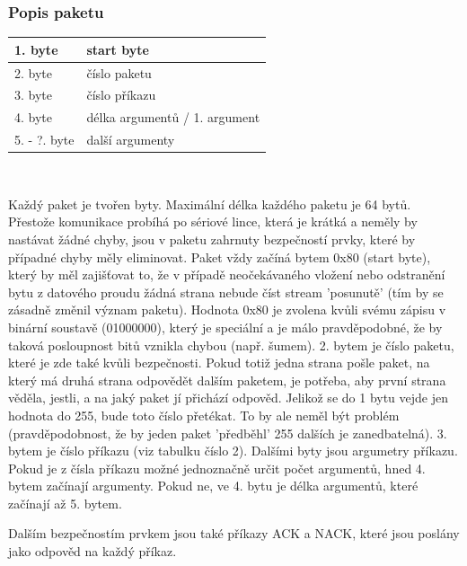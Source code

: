 \documentclass[12pt, a4paper, oneside]{article}
\begin{document}
\subsubsection{Popis paketu}

\vspace{3mm}
\begin{center}
\begin{tabular}{| l | l |}
\hline
1. byte & start byte \\ \hline
2. byte & číslo paketu \\ \hline
3. byte & číslo příkazu \\ \hline
4. byte & délka argumentů / 1. argument \\ \hline
5. - ?. byte & další argumenty \\ \hline
\end {tabular}
\\
\vspace{1mm}
\caption{Tabulka 1: Popis paketu}
\end{center}


Každý paket je tvořen byty. Maximální délka každého paketu je 64 bytů.
Přestože komunikace probíhá po sériové lince, která je krátká a neměly by nastávat žádné chyby, jsou v paketu zahrnuty bezpečností prvky, které by případné chyby měly eliminovat.
Paket vždy začíná bytem 0x80 (start byte), který by měl zajišťovat to, že v případě neočekávaného vložení nebo odstranění bytu z datového proudu žádná strana nebude číst stream 'posunutě' (tím by se zásadně změnil význam paketu). Hodnota 0x80 je zvolena kvůli svému zápisu v binární soustavě (01000000), který je speciální a je málo pravděpodobné, že by taková posloupnost bitů vznikla chybou (např. šumem).
2. bytem je číslo paketu, které je zde také kvůli bezpečnosti. Pokud totiž jedna strana pošle paket, na který má druhá strana odpovědět dalším paketem, je potřeba, aby první strana věděla, jestli, a na jaký paket jí přichází odpověd. Jelikož se do 1 bytu vejde jen hodnota do 255, bude toto číslo přetékat. To by ale neměl být problém (pravděpodobnost, že by jeden paket 'předběhl' 255 dalších je zanedbatelná).
3. bytem je číslo příkazu (viz tabulku číslo 2).
Dalšími byty jsou argumetry příkazu. Pokud je z čísla příkazu možné jednoznačně určit počet argumentů, hned 4. bytem začínají argumenty. Pokud ne, ve 4. bytu je délka argumentů, které začínají až 5. bytem.


Dalším bezpečnostím prvkem jsou také příkazy ACK a NACK, které jsou poslány jako odpověd na každý příkaz.
\end{document}
